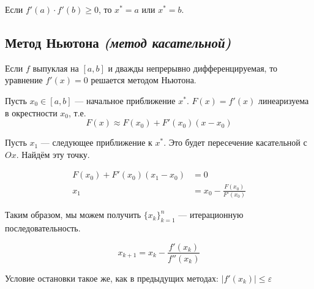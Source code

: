 \begin{remark}
    Если \(f'(a) \cdot f'(b) \geq 0\), то \(x^* = a\) или \(x^* = b\).
\end{remark}

\subsection{Метод Ньютона \textit{(метод касательной)}}

Если \(f\) выпуклая на \([a, b]\) и дважды непрерывно дифференцируемая, то уравнение \(f'(x) = 0\) решается методом Ньютона.

Пусть \(x_0 \in [a, b]\) --- начальное приближение \(x^*\). \(F(x) = f'(x)\) линеаризуема в окрестности \(x_0\), т.е.
\begin{equation}
    F(x) \approx F(x_0) + F'(x_0)(x - x_0)
\end{equation}

Пусть \(x_1\) --- следующее приближение к \(x^*\). Это будет пересечение касательной с \(Ox\). Найдём эту точку.

\begin{align*}
    F(x_0) + F'(x_0) (x_1 - x_0) & = 0                            \\
    x_1                          & = x_0 - \frac{F(x_0)}{F'(x_0)}
\end{align*}

Таким образом, мы можем получить \(\{x_k\}_{k = 1}^{n}\) --- итерационную последовательность.

\[x_{k+1} = x_k - \frac{f'(x_k)}{f''(x_k)} \]

Условие остановки такое же, как в предыдущих методах: \(|f'(x_k)| \leq \varepsilon\)
